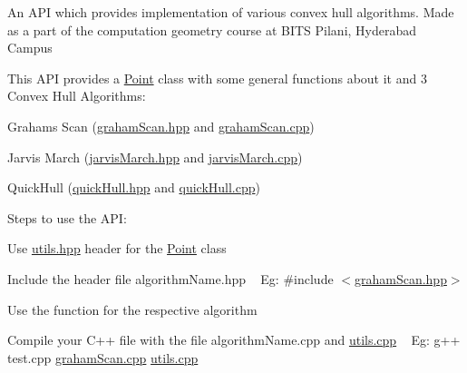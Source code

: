 \label{index_md_Readme}%
%
 An A\+PI which provides implementation of various convex hull algorithms. Made as a part of the computation geometry course at B\+I\+TS Pilani, Hyderabad Campus

This A\+PI provides a \mbox{\hyperlink{class_point}{Point}} class with some general functions about it and 3 Convex Hull Algorithms\+:


\begin{DoxyItemize}
\item Graham\textquotesingle{}s Scan (\mbox{\hyperlink{graham_scan_8hpp}{graham\+Scan.\+hpp}} and \mbox{\hyperlink{graham_scan_8cpp}{graham\+Scan.\+cpp}})
\item Jarvis March (\mbox{\hyperlink{jarvis_march_8hpp}{jarvis\+March.\+hpp}} and \mbox{\hyperlink{jarvis_march_8cpp}{jarvis\+March.\+cpp}})
\item Quick\+Hull (\mbox{\hyperlink{quick_hull_8hpp}{quick\+Hull.\+hpp}} and \mbox{\hyperlink{quick_hull_8cpp}{quick\+Hull.\+cpp}})
\end{DoxyItemize}

Steps to use the A\+PI\+:


\begin{DoxyItemize}
\item Use \mbox{\hyperlink{utils_8hpp}{utils.\+hpp}} header for the \mbox{\hyperlink{class_point}{Point}} class
\item Include the header file algorithm\+Name.\+hpp ~\newline
 Eg\+: \#include $<$\mbox{\hyperlink{graham_scan_8hpp}{graham\+Scan.\+hpp}}$>$
\item Use the function for the respective algorithm
\item Compile your C++ file with the file algorithm\+Name.\+cpp and \mbox{\hyperlink{utils_8cpp}{utils.\+cpp}} ~\newline
 Eg\+: g++ test.\+cpp \mbox{\hyperlink{graham_scan_8cpp}{graham\+Scan.\+cpp}} \mbox{\hyperlink{utils_8cpp}{utils.\+cpp}} 
\end{DoxyItemize}